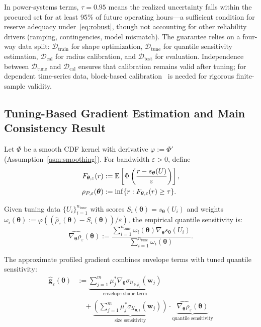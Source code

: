 \documentclass[11pt]{article}
\newcommand{\E}{\mathbb{E}}
\newcommand{\cU}{\mathcal{U}}
\newcommand{\cD}{\mathcal{D}}
\newcommand{\btheta}{\bm{\theta}}
\newcommand{\bw}{\bm{w}}
\newcommand{\bg}{\bm{g}}
\theoremstyle{definition}
\begin{document}
In power-systems terms, $\tau = 0.95$ means the realized uncertainty falls within the procured set for at least 95\% of future operating hours---a sufficient condition for reserve adequacy under~\eqref{eq:robust}, though not accounting for other reliability drivers (ramping, contingencies, model mismatch). The guarantee relies on a four-way data split: $\cD_{\text{train}}$ for shape optimization, $\cD_{\text{tune}}$ for quantile sensitivity estimation, $\cD_{\text{cal}}$ for radius calibration, and $\cD_{\text{test}}$ for evaluation. Independence between $\cD_{\text{tune}}$ and $\cD_{\text{cal}}$ ensures that calibration remains valid after tuning; for dependent time-series data, block-based calibration~\citep{barber2023conformal} is needed for rigorous finite-sample validity.

\subsection{Tuning-Based Gradient Estimation and Main Consistency Result}

Let $\Phi$ be a smooth CDF kernel with derivative $\varphi := \Phi'$ (Assumption~\ref{asm:smoothing}). For bandwidth $\varepsilon > 0$, define
\begin{align}\label{eq:smoothed-cdf}
F_{\btheta,\varepsilon}(r) &:= \E\left[\Phi\left(\frac{r - s_{\btheta}(U)}{\varepsilon}\right)\right], \notag\\
\rho_{P,\varepsilon}(\btheta) &:= \inf\{r : F_{\btheta,\varepsilon}(r) \geq \tau\}.
\end{align}

Given tuning data $\{U_i\}_{i=1}^{n_{\text{tune}}}$ with scores $S_i(\btheta) = s_{\btheta}(U_i)$ and weights $\omega_i(\btheta) := \varphi((\hat{\rho}_\varepsilon(\btheta) - S_i(\btheta))/\varepsilon)$, the empirical quantile sensitivity is:
\begin{equation}\label{eq:rhohat-grad}
\widehat{\nabla_{\btheta} \rho_\varepsilon}(\btheta) := \frac{\sum_{i=1}^{n_{\text{tune}}} \omega_i(\btheta) \nabla_{\btheta} s_{\btheta}(U_i)}{\sum_{i=1}^{n_{\text{tune}}} \omega_i(\btheta)}.
\end{equation}

The approximate profiled gradient combines envelope terms with tuned quantile sensitivity:
\begin{equation}\label{eq:ghat}
\boxed{
\begin{aligned}
\hat{\bg}_\varepsilon(\btheta) &:= \underbrace{\sum_{j=1}^m \mu_j^* \nabla_{\btheta} \sigma_{\cU_{\btheta,\hat{\rho}_\varepsilon}}(\bw_j)}_{\text{envelope shape term}} \\
&\quad + \underbrace{\left(\sum_{j=1}^m \mu_j^* \sigma_{\cU_{\btheta,1}}(\bw_j)\right)}_{\text{size sensitivity}} \cdot \underbrace{\widehat{\nabla_{\btheta} \rho_\varepsilon}(\btheta)}_{\text{quantile sensitivity}}
\end{aligned}
}
\end{equation}
\end{document}
